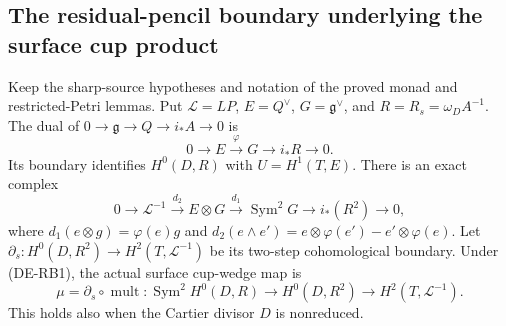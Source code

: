 \subsection{The residual-pencil boundary underlying the surface cup product}

\begin{lemma}
\label{lem:DE-A3-residual-pencil-boundary-candidate}
Keep the sharp-source hypotheses and notation of the proved monad and
restricted-Petri lemmas. Put $\mathcal L=LP$, $E=Q^\vee$,
$G=\mathfrak g^\vee$, and $R=R_s=\omega_D A^{-1}$.
The dual of $0\to\mathfrak g\to Q\to i_*A\to0$ is
\[
0\longrightarrow E\xrightarrow{\varphi}G
\longrightarrow i_*R\longrightarrow0.
\tag{DE-RB1}
\]
Its boundary identifies $H^0(D,R)$ with $U=H^1(T,E)$.
There is an exact complex
\[
0\longrightarrow\mathcal L^{-1}
\xrightarrow{d_2}E\otimes G\xrightarrow{d_1}
\operatorname{Sym}^2G\longrightarrow i_*(R^2)
\longrightarrow0,
\tag{DE-RB2}
\]
where $d_1(e\otimes g)=\varphi(e)g$ and
$d_2(e\wedge e')=e\otimes\varphi(e')-e'\otimes\varphi(e)$.
Let $\partial_s:H^0(D,R^2)\to H^2(T,\mathcal L^{-1})$
be its two-step cohomological boundary. Under (DE-RB1), the
actual surface cup-wedge map is
\[
\mu=\partial_s\circ\operatorname{mult}:
\operatorname{Sym}^2H^0(D,R)\longrightarrow H^0(D,R^2)
\longrightarrow H^2(T,\mathcal L^{-1}).
\tag{DE-RB3}
\]
This holds also when the Cartier divisor $D$ is nonreduced.
\end{lemma}
